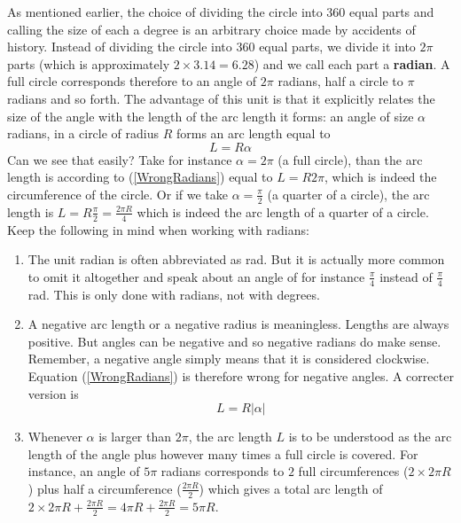 \noindent As mentioned earlier, the choice of dividing the circle into $360$ equal parts and calling the size of each a degree is an arbitrary choice made by accidents of history. Instead of dividing the circle into $360$ equal parts, we divide it into $2\pi$ parts (which is approximately $2\times 3.14 = 6.28$) and we call each part a \textbf{radian}. A full circle corresponds therefore to an angle of $2 \pi$ radians, half a circle to $\pi$ radians and so forth. The advantage of this unit is that it explicitly relates the size of the angle with the length of the arc length it forms: an angle of size $\alpha$ radians, in a circle of radius $R$ forms an arc length equal to
\begin{equation}
\label{WrongRadians}
L = R \alpha
\end{equation}
\noindent Can we see that easily? Take for instance $\alpha = 2\pi$ (a full circle), than the arc length is according to (\ref{WrongRadians}) equal to $L = R 2 \pi $, which is indeed the circumference of the circle. Or if we take $\alpha=\frac{\pi}{2}$ (a quarter of a circle), the arc length is $L = R \frac{\pi}{2} = \frac{2 \pi R}{4}$ which is indeed the arc length of a quarter of a circle. Keep the following in mind when working with radians:
\begin{enumerate}
\item The unit radian is often abbreviated as rad. But it is actually more common to omit it altogether and speak about an angle of for instance $\frac{\pi}{4}$ instead of $\frac{\pi}{4}$ rad. This is only done with radians, not with degrees.
\item A negative arc length or a negative radius is meaningless. Lengths are always positive. But angles can be negative and so negative radians do make sense. Remember, a negative angle simply means that it is considered clockwise. Equation (\ref{WrongRadians}) is therefore wrong for negative angles. A correcter version is 
\begin{equation}
L = R |\alpha|
\end{equation}
\item Whenever $\alpha$ is larger than $2\pi$, the arc length $L$ is to be understood as the arc length of the angle plus however many times a full circle is covered. For instance, an angle of $5 \pi$ radians corresponds to $2$ full circumferences ($ 2 \times 2 \pi R$) plus half a circumference ($\frac{2 \pi R}{2}$) which gives a total arc length of $ 2 \times 2 \pi R + \frac{2 \pi R}{2} = 4 \pi R + \frac{2 \pi R}{2} = 5 \pi R$. 
\end{enumerate}
